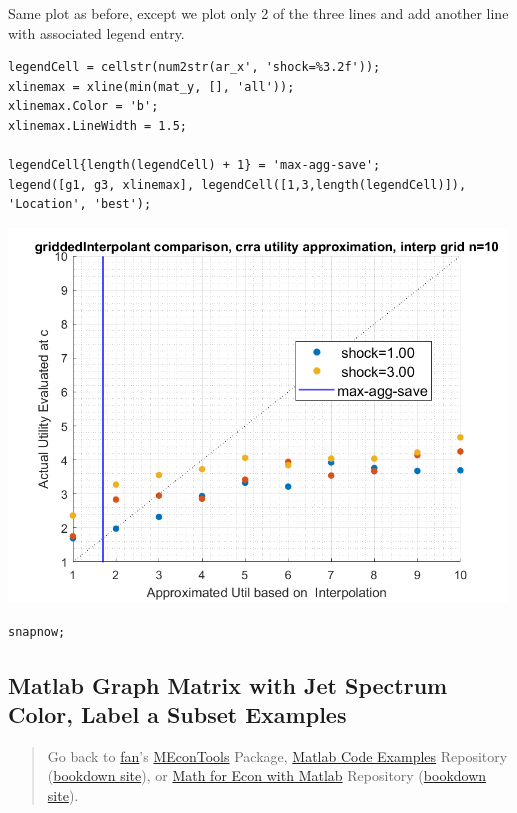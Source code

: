 \documentclass[
]{book}
\begin{document}
Same plot as before, except we plot only 2 of the three lines and add
another line with associated legend entry.

\begin{verbatim}
legendCell = cellstr(num2str(ar_x', 'shock=%3.2f'));
xlinemax = xline(min(mat_y, [], 'all'));
xlinemax.Color = 'b';
xlinemax.LineWidth = 1.5;

legendCell{length(legendCell) + 1} = 'max-agg-save';
legend([g1, g3, xlinemax], legendCell([1,3,length(legendCell)]), 'Location', 'best');
\end{verbatim}

\includegraphics[width=5.20833in,height=\textheight]{img/fs_titling_images/figure_2.png}

\begin{verbatim}
snapnow;
\end{verbatim}

\hypertarget{matlab-graph-matrix-with-jet-spectrum-color-label-a-subset-examples}{%
\subsection{Matlab Graph Matrix with Jet Spectrum Color, Label a Subset Examples}\label{matlab-graph-matrix-with-jet-spectrum-color-label-a-subset-examples}}

\begin{quote}
Go back to \href{http://fanwangecon.github.io/}{fan}'s \href{https://fanwangecon.github.io/MEconTools/}{MEconTools} Package, \href{https://fanwangecon.github.io/M4Econ/}{Matlab Code Examples} Repository (\href{https://fanwangecon.github.io/M4Econ/bookdown}{bookdown site}), or \href{https://fanwangecon.github.io/Math4Econ/}{Math for Econ with Matlab} Repository (\href{https://fanwangecon.github.io/Math4Econ/bookdown}{bookdown site}).
\end{quote}
\end{document}
